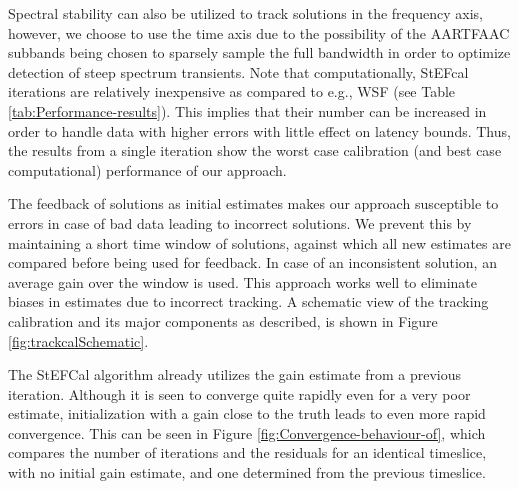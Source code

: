 \documentclass{aa}
\begin{document}
Spectral  stability can also  be utilized  to track  solutions in  the frequency
axis, however,  we choose to  use the  time axis due  to the possibility  of the
AARTFAAC subbands being chosen to sparsely sample the full bandwidth in order to
optimize  detection of  steep spectrum  transients.  Note  that computationally,
StEFcal  iterations are  relatively inexpensive  as compared  to e.g.,  WSF (see
Table  \ref{tab:Performance-results}).  This  implies that  their number  can be
increased  in order  to handle  data with  higher errors  with little  effect on
latency bounds.  Thus,  the results from a single iteration  show the worst case
calibration (and best case computational) performance of our approach.

The feedback of solutions as initial estimates makes our approach susceptible to
errors in case  of bad data leading to incorrect solutions.   We prevent this by
maintaining a  short time window of  solutions, against which  all new estimates
are  compared  before being  used  for feedback.   In  case  of an  inconsistent
solution, an average gain over the  window is used.  This approach works well to
eliminate biases in estimates due to incorrect tracking. A schematic view of the
tracking calibration and  its major components as described,  is shown in Figure
\ref{fig:trackcalSchematic}.

The  StEFCal  algorithm already  utilizes  the  gain  estimate from  a  previous
iteration. Although  it is seen to converge  quite rapidly even for  a very poor
estimate, initialization with a gain close to the truth leads to even more rapid
convergence.   This can  be seen  in  Figure \ref{fig:Convergence-behaviour-of},
which  compares the  number of  iterations and  the residuals  for  an identical
timeslice, with no  initial gain estimate, and one  determined from the previous
timeslice.
\end{document}
